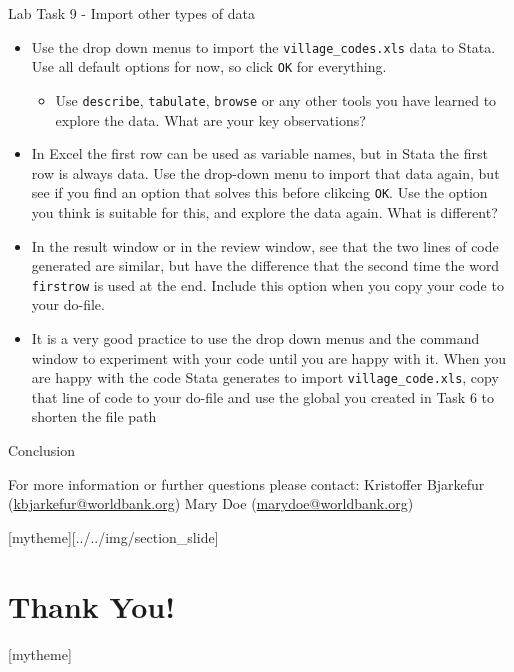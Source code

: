 \documentclass[aspectratio=169]{beamer}
\newcommand{\sectionpic}[2]{
	\setbeamertemplate{section page}[mytheme][#2]
	\section{#1}
	\setbeamertemplate{section page}[mytheme]
}
\begin{document}
\begin{frame}{Lab Task 9 - Import other types of data}
	\begin{itemize}
		\item \small Use the drop down menus to import the \texttt{village\_codes.xls} data to Stata. Use all default options for now, so click \texttt{OK} for everything.
		\begin{itemize}
			\item \small Use \texttt{describe}, \texttt{tabulate}, \texttt{browse} or any other tools you have learned to explore the data. What are your key observations?
		\end{itemize}
		\item \small In Excel the first row can be used as variable names, but in Stata the first row is always data. Use the drop-down menu to import that data again, but see if you find an option that solves this before clikcing \texttt{OK}. Use the option you think is suitable for this, and explore the data again. What is different?
		\item \small In the result window or in the review window, see that the two lines of code generated are similar, but have the difference that the second time the word \texttt{firstrow} is used at the end. Include this option when you copy your code to your do-file.
		\item \small It is a very good practice to use the drop down menus and the command window to experiment with your code until you are happy with it. When you are happy with the code Stata generates to import \texttt{village\_code.xls}, copy that line of code to your do-file and use the global you created in Task 6 to shorten the file path
	\end{itemize}
\end{frame}

\begin{frame}{Conclusion}


\vspace{20mm}
For more information or further questions please contact:
\newline Kristoffer Bjarkefur (\url{kbjarkefur@worldbank.org}) \newline Mary Doe (\url{marydoe@worldbank.org})

\end{frame}

\sectionpic{Thank You!}{../../img/section_slide}
\end{document}
